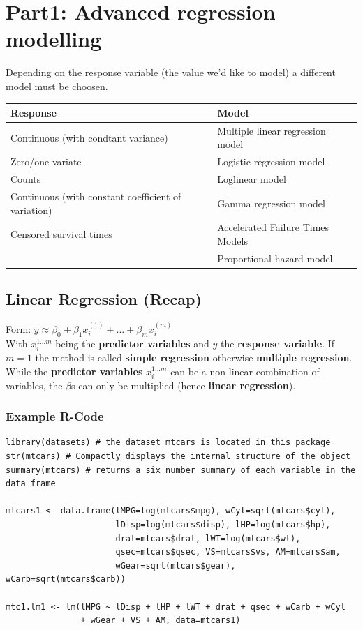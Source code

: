 \section{Part1: Advanced regression modelling}

Depending on the response variable (the value we'd like to model) a different model must be choosen.

\begin{tabular}{|l|l|}
	\hline 
	\textbf{Response} & \textbf{Model} \\ 
	\hline 
	Continuous (with condtant variance) & Multiple linear regression model \\ 
	\hline 
	Zero/one variate & Logistic regression model \\ 
	\hline 
	Counts & Loglinear model \\ 
	\hline 
	Continuous (with constant coefficient of variation) & Gamma regression model \\ 
	\hline 
	Censored survival times & Accelerated Failure Times Models \\
	& Proportional hazard model \\
	\hline 
\end{tabular} 

\subsection{Linear Regression (Recap)}

Form: $y \approx \beta_0 + \beta_1 x_i^{(1)} + ... + \beta_m x_i^{(m)}$\\
With $x_i^{1...m}$ being the \textbf{predictor variables} and $y$ the \textbf{response variable}. If $m=1$ the method is called \textbf{simple regression} otherwise \textbf{multiple regression}. While the \textbf{predictor variables} $x_i^{1...m}$ can be a non-linear combination of variables, the $\beta$s can only be multiplied (hence \textbf{linear regression}).

\subsubsection{Example R-Code}
\begin{lstlisting}
library(datasets) # the dataset mtcars is located in this package
str(mtcars) # Compactly displays the internal structure of the object
summary(mtcars) # returns a six number summary of each variable in the data frame

mtcars1 <- data.frame(lMPG=log(mtcars$mpg), wCyl=sqrt(mtcars$cyl),
					  lDisp=log(mtcars$disp), lHP=log(mtcars$hp),
					  drat=mtcars$drat, lWT=log(mtcars$wt),
					  qsec=mtcars$qsec, VS=mtcars$vs, AM=mtcars$am,
					  wGear=sqrt(mtcars$gear), wCarb=sqrt(mtcars$carb))

mtc1.lm1 <- lm(lMPG ~ lDisp + lHP + lWT + drat + qsec + wCarb + wCyl
               + wGear + VS + AM, data=mtcars1)
\end{lstlisting}

